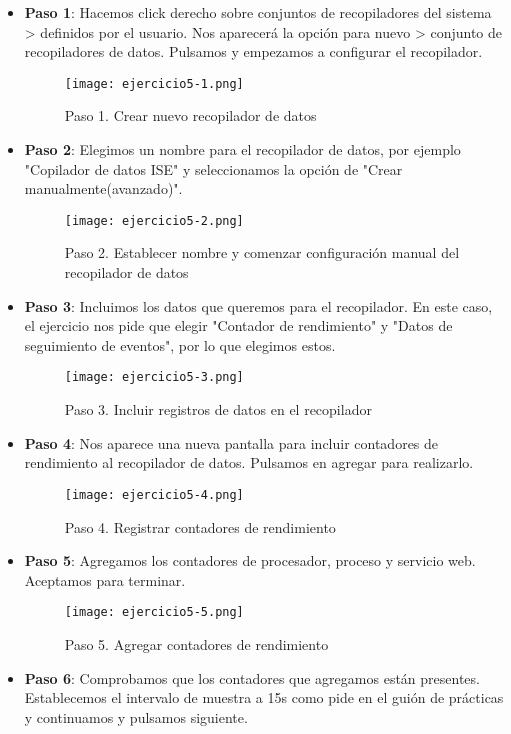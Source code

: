 	\begin{itemize}
		\item \textbf{Paso 1}: Hacemos click derecho sobre conjuntos de recopiladores del sistema > definidos por el usuario. Nos aparecerá la opción para nuevo > conjunto de recopiladores de datos. Pulsamos y empezamos a configurar el recopilador.
			\begin{figure}[H] 
				\centering
				\texttt{[image: ejercicio5-1.png]} 
				\label{figura2} 
				\caption{Paso 1. Crear nuevo recopilador de datos}
			\end{figure}
		\item \textbf{Paso 2}: Elegimos un nombre para el recopilador de datos, por ejemplo "Copilador de datos ISE" y seleccionamos la opción de "Crear manualmente(avanzado)".
			\begin{figure}[H] 
				\centering
				\texttt{[image: ejercicio5-2.png]} 
				\label{figura2} 
				\caption{Paso 2. Establecer nombre y comenzar configuración manual del recopilador de datos}
			\end{figure}
		\item \textbf{Paso 3}: Incluimos los datos que queremos para el recopilador. En este caso, el ejercicio nos pide que elegir "Contador de rendimiento" y "Datos de seguimiento de eventos", por lo que elegimos estos.
			\begin{figure}[H] 
				\centering
				\texttt{[image: ejercicio5-3.png]} 
				\label{figura2} 
				\caption{Paso 3. Incluir registros de datos en el recopilador}
			\end{figure}
		\item \textbf{Paso 4}: Nos aparece una nueva pantalla para incluir contadores de rendimiento al recopilador de datos. Pulsamos en agregar para realizarlo.
			\begin{figure}[H] 
				\centering
				\texttt{[image: ejercicio5-4.png]} 
				\label{figura2} 
				\caption{Paso 4. Registrar contadores de rendimiento}
			\end{figure}
		\item \textbf{Paso 5}: Agregamos los contadores de procesador, proceso y servicio web. Aceptamos para terminar.
			\begin{figure}[H] 
				\centering
				\texttt{[image: ejercicio5-5.png]} 
				\label{figura2} 
				\caption{Paso 5. Agregar contadores de rendimiento}
			\end{figure}
		\item \textbf{Paso 6}: Comprobamos que los contadores que agregamos están presentes. Establecemos el intervalo de muestra a 15s como pide en el guión de prácticas y continuamos y pulsamos siguiente.

\end{itemize}
